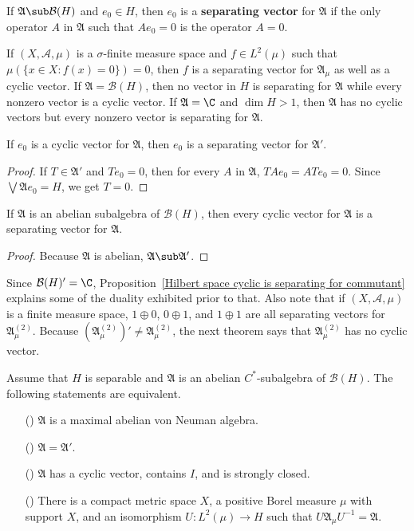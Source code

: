 \begin{definition}
If $\mathfrak{A}\sub\mathcal{B}(H)$ and $e_0\in H$, then $e_0$ is a \textbf{separating vector} for $\mathfrak{A}$ if the only operator $A$ in $\mathfrak{A}$ such that $Ae_0=0$ is the operator $A=0$.
\end{definition}
If $(X,\mathcal{A},\mu)$ is a $\sigma$-finite measure space and $f\in L^2(\mu)$ such that $\mu(\{x\in X:f(x)=0\})=0$, then $f$ is a separating vector for $\mathfrak{A}_\mu$ as well as a cyclic vector. If $\mathfrak{A}=\mathcal{B}(H)$, then no vector in $H$ is separating for $\mathfrak{A}$ while every nonzero vector is a cyclic vector. If $\mathfrak{A}=\C$ and $\dim H>1$, then $\mathfrak{A}$ has no cyclic vectors but every nonzero vector is separating for $\mathfrak{A}$.
\begin{proposition}\label{Hilbert space cyclic is separating for commutant}
If $e_0$ is a cyclic vector for $\mathfrak{A}$, then $e_0$ is a separating vector for $\mathfrak{A}'$.
\end{proposition}
\begin{proof}
If $T\in\mathfrak{A}'$ and $Te_0=0$, then for every $A$ in $\mathfrak{A}$, $TAe_0=ATe_0=0$. Since $\bigvee\mathfrak{A}e_0=H$, we get $T=0$.
\end{proof}
\begin{corollary}
If $\mathfrak{A}$ is an abelian subalgebra of $\mathcal{B}(H)$, then every cyclic vector for $\mathfrak{A}$ is a separating vector for $\mathfrak{A}$.
\end{corollary}
\begin{proof}
Because $\mathfrak{A}$ is abelian, $\mathfrak{A}\sub\mathfrak{A}'$.
\end{proof}
Since $\mathcal{B}(H)'=\C$, Proposition~\ref{Hilbert space cyclic is separating for commutant} explains some of the duality exhibited prior to that. Also note that if $(X,\mathcal{A},\mu)$ is a finite measure space, $1\oplus 0$, $0\oplus 1$, and $1\oplus 1$ are all separating vectors for $\mathfrak{A}^{(2)}_\mu$. Because $(\mathfrak{A}^{(2)}_\mu)'\neq\mathfrak{A}^{(2)}_\mu$, the next theorem says that $\mathfrak{A}^{(2)}_\mu$ has no cyclic vector.
\begin{theorem}\label{Hilbert space maximal abelian von Neumann algebra iff}
Assume that $H$ is separable and $\mathfrak{A}$ is an abelian $C^*$-subalgebra of $\mathcal{B}(H)$. The following statements are equivalent.
\begin{itemize}
\item[(\rmnum{1})] $\mathfrak{A}$ is a maximal abelian von Neuman algebra.
\item[(\rmnum{2})] $\mathfrak{A}=\mathfrak{A}'$.
\item[(\rmnum{3})] $\mathfrak{A}$ has a cyclic vector, contains $I$, and is strongly closed.
\item[(\rmnum{4})] There is a compact metric space $X$, a positive Borel measure $\mu$ with support $X$, and an isomorphism $U:L^2(\mu)\to H$ such that $U\mathfrak{A}_\mu U^{-1}=\mathfrak{A}$.
\end{itemize}
\end{theorem}

